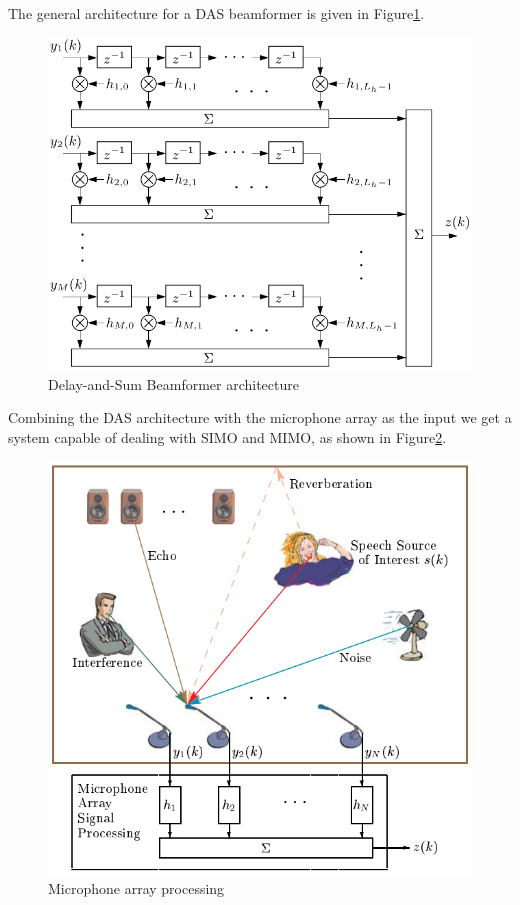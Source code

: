 The general architecture for a DAS beamformer is given in Figure\;\ref{fig:das_arch}.
\begin{figure}[H]
    \centering
    \includegraphics[width=0.85\linewidth]{Beamformers/images/DAS_arch.png}
    \caption{Delay-and-Sum Beamformer architecture}\label{fig:das_arch}
\end{figure}

Combining the DAS architecture with the microphone array as the input
we get a system capable of dealing with SIMO and MIMO, as shown in
Figure\;\ref{fig:mic_array_proc}.

\begin{figure}[H]
    \centering
    \includegraphics[width=0.65\linewidth]{Beamformers/images/mic_array_proc.png}
    \caption{Microphone array processing}\label{fig:mic_array_proc}
\end{figure}

